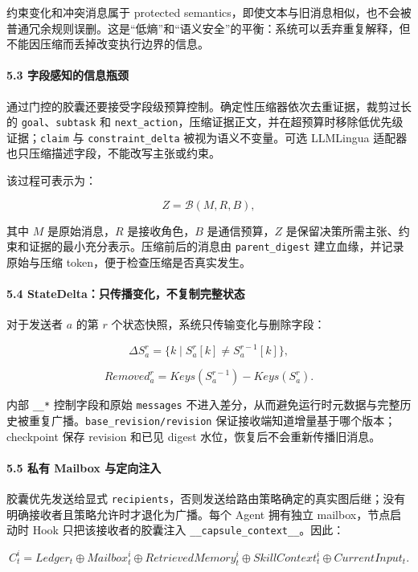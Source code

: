 \documentclass[UTF8,a4paper,12pt]{ctexart}
\begin{document}
约束变化和冲突消息属于 protected semantics，即使文本与旧消息相似，也不会被普通冗余规则误删。这是``低熵''和``语义安全''的平衡：系统可以丢弃重复解释，但不能因压缩而丢掉改变执行边界的信息。

\paragraph{5.3 字段感知的信息瓶颈}

通过门控的胶囊还要接受字段级预算控制。确定性压缩器依次去重证据，裁剪过长的 \texttt{goal}、\texttt{subtask} 和 \texttt{next\_action}，压缩证据正文，并在超预算时移除低优先级证据；\texttt{claim} 与 \texttt{constraint\_delta} 被视为语义不变量。可选 LLMLingua 适配器也只压缩描述字段，不能改写主张或约束。

该过程可表示为：

\[
Z=\mathcal{B}(M,R,B),
\]

其中 \(M\) 是原始消息，\(R\) 是接收角色，\(B\) 是通信预算，\(Z\) 是保留决策所需主张、约束和证据的最小充分表示。压缩前后的消息由 \texttt{parent\_digest} 建立血缘，并记录原始与压缩 token，便于检查压缩是否真实发生。

\paragraph{5.4 StateDelta：只传播变化，不复制完整状态}

对于发送者 \(a\) 的第 \(r\) 个状态快照，系统只传输变化与删除字段：

\[
\Delta S_a^r=\{k\mid S_a^r[k]\ne S_a^{r-1}[k]\},
\]

\[
Removed_a^r=Keys(S_a^{r-1})-Keys(S_a^r).
\]

内部 \texttt{\_\_*} 控制字段和原始 \texttt{messages} 不进入差分，从而避免运行时元数据与完整历史被重复广播。\texttt{base\_revision/revision} 保证接收端知道增量基于哪个版本；checkpoint 保存 revision 和已见 digest 水位，恢复后不会重新传播旧消息。

\paragraph{5.5 私有 Mailbox 与定向注入}

胶囊优先发送给显式 \texttt{recipients}，否则发送给路由策略确定的真实图后继；没有明确接收者且策略允许时才退化为广播。每个 Agent 拥有独立 mailbox，节点启动时 Hook 只把该接收者的胶囊注入 \texttt{\_\_capsule\_context\_\_}。因此：

\[
C_t^i=Ledger_t\oplus Mailbox_t^i\oplus RetrievedMemory_t^i
\oplus SkillContext_t^i\oplus CurrentInput_t.
\]
\end{document}
